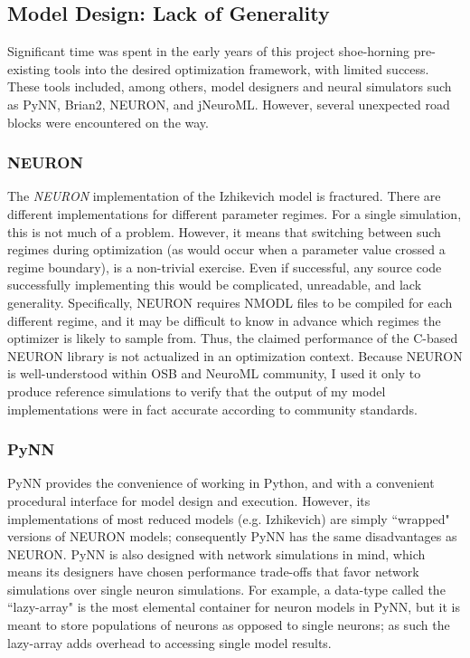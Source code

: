 \subsection{Model Design: Lack of Generality}
Significant time was spent in the early years of this project shoe-horning pre-existing tools into the desired optimization framework, with limited success.
These tools included, among others, model designers and neural simulators such as PyNN, Brian2, NEURON, and jNeuroML.
However, several unexpected road blocks were encountered on the way.

\subsubsection{NEURON}
The \emph{NEURON} implementation of the Izhikevich model is fractured.
There are different implementations for different parameter regimes.
For a single simulation, this is not much of a problem.
However, it means that switching between such regimes during optimization (as would occur when a parameter value crossed a regime boundary), is a non-trivial exercise.
Even if successful, any source code successfully implementing this would be complicated, unreadable, and lack generality.
Specifically, NEURON requires NMODL files to be compiled for each different regime, and it may be difficult to know in advance which regimes the optimizer is likely to sample from.
Thus, the claimed performance of the C-based NEURON library is not actualized in an optimization context.
Because NEURON is well-understood within OSB and NeuroML community, I used it only to produce reference simulations to verify that the output of my model implementations were in fact accurate according to community standards.

\subsubsection{PyNN}
PyNN provides the convenience of working in Python, and with a convenient procedural interface for model design and execution.
However, its implementations of most reduced models (e.g. Izhikevich) are simply ``wrapped" versions of NEURON models; consequently PyNN has the same disadvantages as NEURON.
PyNN is also designed with network simulations in mind, which means its designers have chosen performance trade-offs that favor network simulations over single neuron simulations.
For example, a data-type called the ``lazy-array" is the most elemental container for neuron models in PyNN, but it is meant to store populations of neurons as opposed to single neurons;
as such the lazy-array adds overhead to accessing single model results.


